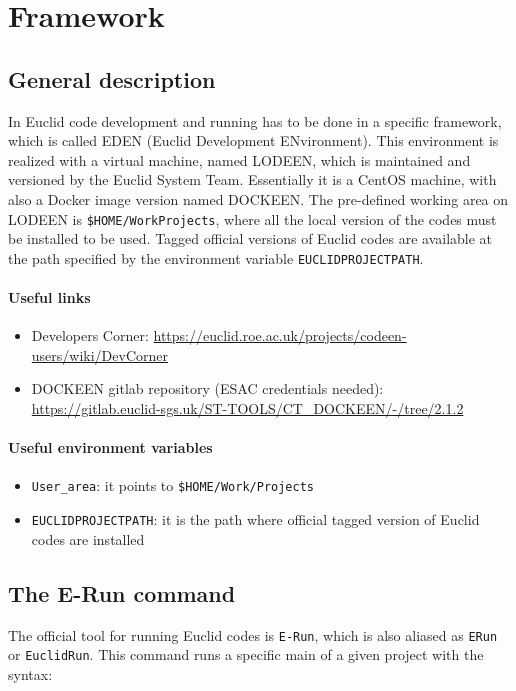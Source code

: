 \section{Framework}\label{sec:framework}
\subsection{General description}
In Euclid code development and running has to be done in a specific framework, which is called EDEN (Euclid Development ENvironment). This environment is realized with a virtual machine, named LODEEN, which is maintained and versioned by the Euclid System Team. Essentially it is a CentOS machine, with also a Docker image version named DOCKEEN. The pre-defined working area on LODEEN is \verb+$HOME/WorkProjects+, where all the local version of the codes must be installed to be used. Tagged official versions of Euclid codes are available at the path specified by the environment variable \verb+EUCLIDPROJECTPATH+.

\paragraph{Useful links}
\begin{itemize}
\item Developers Corner: \url{https://euclid.roe.ac.uk/projects/codeen-users/wiki/DevCorner}
\item DOCKEEN gitlab repository (ESAC credentials needed): \url{https://gitlab.euclid-sgs.uk/ST-TOOLS/CT_DOCKEEN/-/tree/2.1.2}
\end{itemize}

\paragraph{Useful environment variables}
\begin{itemize}
\item \verb+User_area+: it points to \verb+$HOME/Work/Projects+
\item \verb+EUCLIDPROJECTPATH+: it is the path where official tagged version of Euclid codes are installed
\end{itemize}


\subsection{The E-Run command}
The official tool for running Euclid codes is \verb+E-Run+, which is also aliased as \verb+ERun+ or \verb+EuclidRun+. This command runs a specific main of a given project with the syntax:

